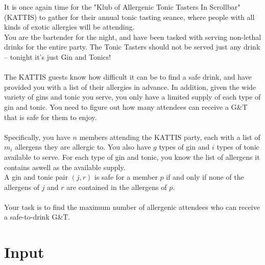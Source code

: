 

\noindent It is once again time for the "Klub of Allergenic Tonic Tasters In Scrollbar" (KATTIS) to gather for their annual tonic tasting seance, where people with all kinds of exotic allergies will be attending. 
\\
\noindent You are the bartender for the night, and have been tasked with serving non-lethal drinks for the entire party. 
The Tonic Tasters should not be served just any drink -- tonight it's just Gin and Tonics!
\\\\
\noindent The KATTIS guests know how difficult it can be to find a safe drink, and have provided you with a list of their allergies in advance.
In addition, given the wide variety of gins and tonic you serve, you only have a limited supply of each type of gin and tonic.
You need to figure out how many attendees can receive a G\&T that is safe for them to enjoy.
\\\\
\noindent Specifically, you have $n$ members attending the KATTIS party, each with a list of $m_i$ allergens they are allergic to.
You also have $g$ types of gin and $i$ types of tonic available to serve.
For each type of gin and tonic, you know the list of allergens it contains aswell as the available supply.
\\

\noindent A gin and tonic pair $(j,r)$ is safe for a member $p$ if and only if none of the allergens of $j$ and $r$ are contained in the allergens of $p$.
\\\\
\noindent Your task is to find the maximum number of allergenic attendees who can receive a safe-to-drink G\&T.

\section*{Input}

